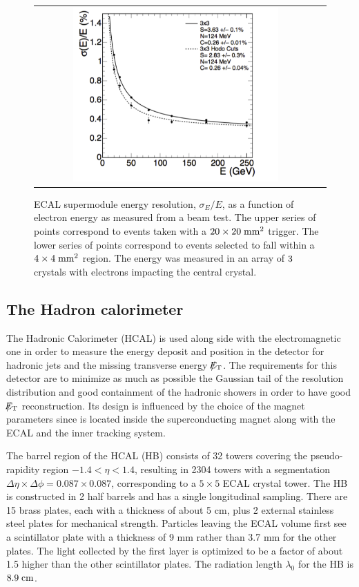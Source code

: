 \begin{figure}[tbh!]
	\centering
	\begin{tabular}{cc}
		\includegraphics[width=0.75\textwidth]{detector/pics/ECAL_resolution.pdf}
	\end{tabular}
	\caption{ECAL supermodule energy resolution, $\sigma_{E}/E$, as a function of electron energy as measured from a beam test. The upper series of points correspond to events taken with a $20\times20\;\text{mm}^{2}$ trigger. The lower series of points correspond to events selected to fall within a $4\times4\;\text{mm}^{2}$ region. The energy was measured in an array of $3\time3$ crystals with electrons impacting the central crystal.}
	\label{fig:ECAL_resolution}
\end{figure}

\clearpage

\subsection{The Hadron calorimeter}

The Hadronic Calorimeter (HCAL) is used along side with the electromagnetic one in order to measure the energy deposit and position in the detector for hadronic jets and the missing transverse energy $\slash\mkern-12mu{E}_{\text{T}}$. The requirements for this detector are to minimize as much as possible the Gaussian tail of the resolution distribution and good containment of the hadronic showers in order to have good $\slash\mkern-12mu{E}_{\text{T}}$ reconstruction. Its design is influenced by the choice of the magnet parameters since is located inside the superconducting magnet along with the ECAL and the inner tracking system. 

The barrel region of the HCAL (HB) consists of 32 towers covering the pseudo-rapidity region $−1.4 < \eta < 1.4$, resulting in 2304 towers with a segmentation $\Delta\eta\times\Delta\phi = 0.087\times0.087$, corresponding to a $5\times5$ ECAL crystal tower. The HB is constructed in 2 half barrels and has a single longitudinal sampling. There are 15 brass plates, each with a thickness of about 5 cm, plus 2 external stainless steel plates for mechanical strength. Particles leaving the ECAL volume first see a scintillator plate with a thickness of 9 mm rather than 3.7 mm for the other plates. The light collected by the first layer is optimized to be a factor of about 1.5 higher than the other scintillator plates. The radiation length $\lambda_{0}$ for the HB is $8.9\;\text{cm}$.

